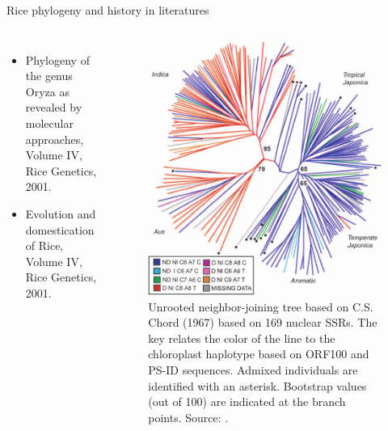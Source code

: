\documentclass[
  ignorenonframetext,
  aspectratio=169]{beamer}
\providecommand{\tightlist}{%
  \setlength{\itemsep}{0pt}\setlength{\parskip}{0pt}}
\newcommand{\bcolumns}{\begin{columns}[T, onlytextwidth]}
\newcommand{\ecolumns}{\end{columns}}
\begin{document}
\begin{frame}{Rice phylogeny and history in literatures}
\protect\hypertarget{rice-phylogeny-and-history-in-literatures}{}
\bcolumns
{}

\begin{itemize}
\tightlist
\item
  Phylogeny of the genus Oryza as revealed by molecular approaches,
  Volume IV, Rice Genetics, 2001.
\item
  Evolution and domestication of Rice, Volume IV, Rice Genetics, 2001.
\end{itemize}


\begin{figure}
\includegraphics[width=0.6\linewidth]{../images/oryza_genus_phylogenetic_relationship} \caption{Unrooted neighbor-joining tree based on C.S. Chord (1967) based on 169 nuclear SSRs. The key relates the color of the line to the chloroplast haplotype based on ORF100 and PS-ID sequences. Admixed individuals are identified with an asterisk. Bootstrap values (out of 100) are indicated at the branch points. Source: \cite{garris2005genetic}.}\label{fig:oryza-phylogenetic-relationship}
\end{figure}

\ecolumns
\end{frame}
\end{document}

